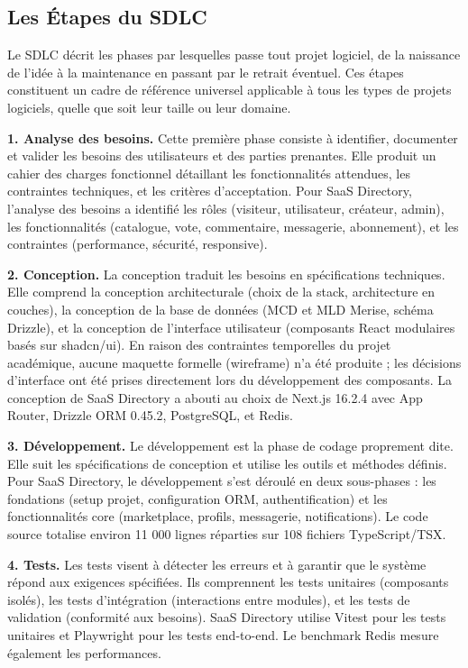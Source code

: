 \subsection{Les Étapes du SDLC}

Le SDLC décrit les phases par lesquelles passe tout projet logiciel, de la naissance de l'idée à la maintenance en passant par le retrait éventuel. Ces étapes constituent un cadre de référence universel applicable à tous les types de projets logiciels, quelle que soit leur taille ou leur domaine.

\textbf{1. Analyse des besoins.} Cette première phase consiste à identifier, documenter et valider les besoins des utilisateurs et des parties prenantes. Elle produit un cahier des charges fonctionnel détaillant les fonctionnalités attendues, les contraintes techniques, et les critères d'acceptation. Pour SaaS Directory, l'analyse des besoins a identifié les rôles (visiteur, utilisateur, créateur, admin), les fonctionnalités (catalogue, vote, commentaire, messagerie, abonnement), et les contraintes (performance, sécurité, responsive).

\textbf{2. Conception.} La conception traduit les besoins en spécifications techniques. Elle comprend la conception architecturale (choix de la stack, architecture en couches), la conception de la base de données (MCD et MLD Merise, schéma Drizzle), et la conception de l'interface utilisateur (composants React modulaires basés sur shadcn/ui). En raison des contraintes temporelles du projet académique, aucune maquette formelle (wireframe) n'a été produite ; les décisions d'interface ont été prises directement lors du développement des composants. La conception de SaaS Directory a abouti au choix de Next.js 16.2.4 avec App Router, Drizzle ORM 0.45.2, PostgreSQL, et Redis.

\textbf{3. Développement.} Le développement est la phase de codage proprement dite. Elle suit les spécifications de conception et utilise les outils et méthodes définis. Pour SaaS Directory, le développement s'est déroulé en deux sous-phases : les fondations (setup projet, configuration ORM, authentification) et les fonctionnalités core (marketplace, profils, messagerie, notifications). Le code source totalise environ 11 000 lignes réparties sur 108 fichiers TypeScript/TSX.

\textbf{4. Tests.} Les tests visent à détecter les erreurs et à garantir que le système répond aux exigences spécifiées. Ils comprennent les tests unitaires (composants isolés), les tests d'intégration (interactions entre modules), et les tests de validation (conformité aux besoins). SaaS Directory utilise Vitest pour les tests unitaires et Playwright pour les tests end-to-end. Le benchmark Redis mesure également les performances.

